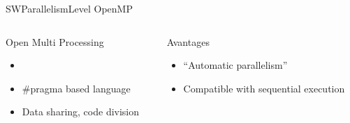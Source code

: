 %
\begin{Frame}{SWParallelismLevel OpenMP}
  \begin{columns}[t]
    \begin{column}{\BW} %
      \begin{block}{Open Multi Processing}
        \begin{itemize}
        \item {}
        \item \#pragma based language
        \item Data sharing, code division
        \end{itemize}
      \end{block} 
    \end{column}
    
    \begin{column}{\BW} %
      \begin{alertblock}{Avantages}
        \begin{itemize}
        \item ``Automatic parallelism''
        \item Compatible with sequential execution
        \end{itemize}
      \end{alertblock}   
    \end{column}
  \end{columns}  
\end{Frame}


